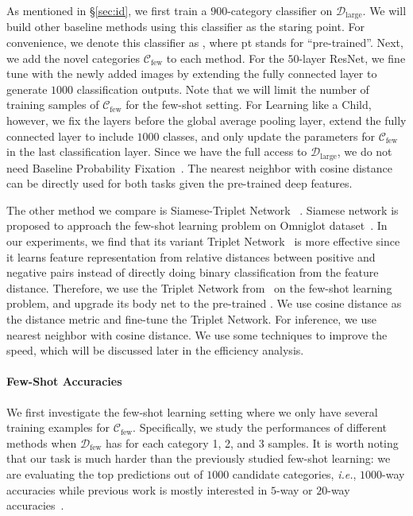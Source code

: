 As mentioned in \S\ref{sec:id}, we first train a $900$-category classifier on $\mathcal{D}_{\text{large}}$.
We will build other baseline methods using this classifier as the staring point. For convenience, we denote this classifier as , where pt stands for ``pre-trained''.
Next, we add the novel categories $\mathcal{C}_{\text{few}}$ to each method. For the $50$-layer ResNet, we fine tune  with the newly added images by extending the fully connected layer to generate $1000$ classification outputs. Note that we will limit the number of training samples of $\mathcal{C}_{\text{few}}$ for the few-shot setting.
For Learning like a Child, however, we fix the layers before the global average pooling layer, extend the fully connected layer to include $1000$ classes, and only update the parameters for $\mathcal{C}_{\text{few}}$ in the last classification layer.
Since we have the full access to $\mathcal{D}_{\text{large}}$, we do not need Baseline Probability
Fixation~\cite{mao2015learning}. The nearest neighbor with cosine distance can be directly used for both tasks given the pre-trained deep features.

The other method we compare is Siamese-Triplet Network ~\cite{siamese,lin2017transfer}. Siamese network is proposed to approach the few-shot learning problem on Omniglot dataset~\cite{DBLP:conf/cogsci/LakeSGT11}.
In our experiments, we find that its variant Triplet Network~\cite{lin2017transfer,DBLP:conf/iccv/WangG15} is more effective since it learns feature representation from relative distances between positive and negative pairs instead of directly doing binary classification from the feature distance. Therefore, we use the Triplet Network from~\cite{lin2017transfer} on the few-shot learning problem, and upgrade its body net to the pre-trained . We use cosine distance as the distance metric and fine-tune the Triplet Network. For inference, we use nearest neighbor with cosine distance.
We use some techniques to improve the speed, which will be discussed later in the efficiency analysis.

\paragraph{Few-Shot Accuracies}
We first investigate the few-shot learning setting where we only have several training examples for $\mathcal{C}_{\text{few}}$. Specifically, we study the performances of different methods when $\mathcal{D}_{\text{few}}$ has for each category 1, 2, and 3 samples.
It is worth noting that our task is much harder than the previously studied few-shot learning: we are evaluating the top predictions out of $1000$ candidate categories, \textit{i.e.}, $1000$-way accuracies while previous work is mostly interested in $5$-way or $20$-way accuracies~\cite{pmlr-v70-finn17a,siamese,lin2017transfer,ravi2017optimization,DBLP:conf/nips/VinyalsBLKW16}.


